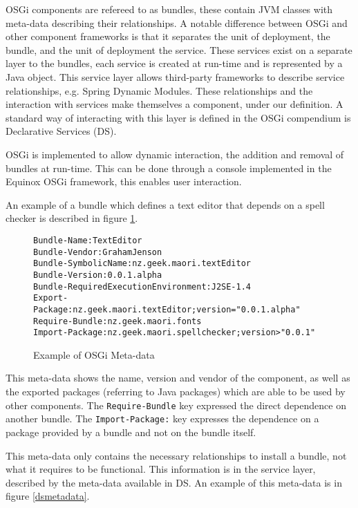 OSGi components are refereed to as bundles, these contain JVM classes with meta-data describing their relationships.
A notable difference between OSGi and other component frameworks is that it separates the unit of deployment, the bundle, and the unit of deployment the service.
These services exist on a separate layer to the bundles, each service is created at run-time and is represented by a Java object.
This service layer allows third-party frameworks to describe service relationships, e.g. Spring Dynamic Modules.
These relationships and the interaction with services make themselves a component, under our definition.
A standard way of interacting with this layer is defined in the OSGi compendium is Declarative Services (DS).

OSGi is implemented to allow dynamic interaction, the addition and removal of bundles at run-time.
This can be done through a console implemented in the Equinox OSGi framework, this enables user interaction.

An example of a bundle which defines a text editor that depends on a spell checker is described in figure \ref{osgibundle}.

\begin{figure}[htp]
\begin{center}
\begin{alltt}
Bundle-Name: TextEditor
Bundle-Vendor: Graham Jenson
Bundle-SymbolicName: nz.geek.maori.textEditor
Bundle-Version: 0.0.1.alpha
Bundle-RequiredExecutionEnvironment: J2SE-1.4
Export-Package: nz.geek.maori.textEditor;version="0.0.1.alpha"
Require-Bundle: nz.geek.maori.fonts
Import-Package: nz.geek.maori.spellchecker;version>"0.0.1"
\end{alltt}
  \caption[OSGi Meta-data]{Example of OSGi Meta-data}
  \label{osgibundle}
\end{center}
\end{figure}

This meta-data shows the name, version and vendor of the component, as well as the exported packages (referring to Java packages) which are able to be used by other components.
The \verb+Require-Bundle+ key expressed the direct dependence on another bundle.
The \verb+Import-Package:+ key expresses the dependence on a package provided by a bundle and not on the bundle itself.

This meta-data only contains the necessary relationships to install a bundle, not what it requires to be functional.
This information is in the service layer, described by the meta-data available in DS.
An example of this meta-data is in figure \ref{dsmetadata}.

